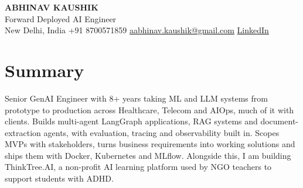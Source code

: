 \documentclass[10pt,a4paper]{article}
\begin{document}
\begin{center}
  {\LARGE\bfseries ABHINAV KAUSHIK}\\[2pt]
  {\large Forward Deployed AI Engineer}\\[2pt]
  New Delhi, India \textbar{} +91 8700571859 \textbar{} \href{mailto:aabhinav.kaushik@gmail.com}{aabhinav.kaushik@gmail.com} \textbar{} \href{https://www.linkedin.com/in/abhinav-kaushik10/}{LinkedIn}  
\end{center}

\section{Summary}
Senior GenAI Engineer with 8+ years taking ML and LLM systems from prototype to production across Healthcare, Telecom and AIOps, much of it with clients. Builds multi-agent LangGraph applications, RAG systems and document-extraction agents, with evaluation, tracing and observability built in. Scopes MVPs with stakeholders, turns business requirements into working solutions and ships them with Docker, Kubernetes and MLflow. Alongside this, I am building ThinkTree.AI, a non-profit AI learning platform used by NGO teachers to support students with ADHD.
\end{document}
